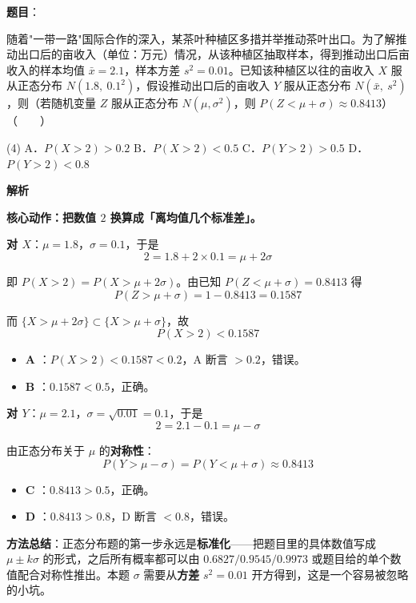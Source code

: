 \begin{answer}

\textbf{题目}：

随着"一带一路"国际合作的深入，某茶叶种植区多措并举推动茶叶出口。为了解推动出口后的亩收入（单位：万元）情况，从该种植区抽取样本，得到推动出口后亩收入的样本均值 $\bar x=2.1$，样本方差 $s^{2}=0.01$。已知该种植区以往的亩收入 $X$ 服从正态分布 $N\left(1.8,\ 0.1^{2}\right)$，假设推动出口后的亩收入 $Y$ 服从正态分布 $N\left(\bar x,\ s^{2}\right)$，则（若随机变量 $Z$ 服从正态分布 $N\left(\mu,\sigma^{2}\right)$，则 $P(Z<\mu+\sigma)\approx0.8413$）\mbox{（　　）}

\begin{gkopts}(4)
\task A．$P(X>2)>0.2$
\task B．$P(X>2)<0.5$
\task C．$P(Y>2)>0.5$
\task D．$P(Y>2)<0.8$
\end{gkopts}

\textbf{解析}

\textbf{核心动作：把数值 $2$ 换算成「离均值几个标准差」。}

\textbf{对 $X$}：$\mu=1.8$，$\sigma=0.1$，于是
\nopagebreak[4]
\[2=1.8+2\times0.1=\mu+2\sigma\]

即 $P(X>2)=P(X>\mu+2\sigma)$。由已知 $P(Z<\mu+\sigma)=0.8413$ 得
\nopagebreak[4]
\[P(Z>\mu+\sigma)=1-0.8413=0.1587\]

而 $\{X>\mu+2\sigma\}\subset\{X>\mu+\sigma\}$，故
\nopagebreak[4]
\[P(X>2)<0.1587\]

\begin{itemize}
\item \textbf{A }：$P(X>2)<0.1587<0.2$，A 断言 $>0.2$，错误。
\item \textbf{B }：$0.1587<0.5$，正确。
\end{itemize}

\textbf{对 $Y$}：$\mu=2.1$，$\sigma=\sqrt{0.01}=0.1$，于是
\nopagebreak[4]
\[2=2.1-0.1=\mu-\sigma\]

由正态分布关于 $\mu$ 的\textbf{对称性}：
\nopagebreak[4]
\[P(Y>\mu-\sigma)=P(Y<\mu+\sigma)\approx0.8413\]

\begin{itemize}
\item \textbf{C }：$0.8413>0.5$，正确。
\item \textbf{D }：$0.8413>0.8$，D 断言 $<0.8$，错误。
\end{itemize}

\begin{gktip}
\textbf{方法总结}：正态分布题的第一步永远是\textbf{标准化}——把题目里的具体数值写成 $\mu\pm k\sigma$ 的形式，之后所有概率都可以由 $0.6827/0.9545/0.9973$ 或题目给的单个数值配合对称性推出。本题 $\sigma$ 需要从\textbf{方差} $s^2=0.01$ 开方得到，这是一个容易被忽略的小坑。
\end{gktip}


\par\medskip

\end{answer}
